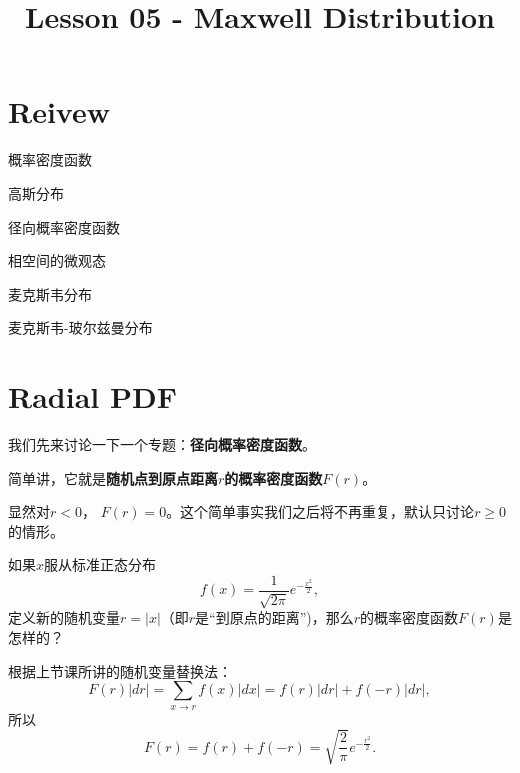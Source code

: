 \documentclass[CJK]{beamer}
\title{Lesson 05 - Maxwell Distribution}
\author{}
\date{}
\begin{document}

\section{Reivew}

\begin{frame}
\bch
{\large
\bitem
\item{概率密度函数}
\item{高斯分布}
\eitem}
\ech
\end{frame}

\begin{frame}
\bch
\bitem
\item{径向概率密度函数}
\item{相空间的微观态}
\item{麦克斯韦分布}
\item{麦克斯韦-玻尔兹曼分布}  
\eitem
\ech
\end{frame}

\section{Radial PDF}



\begin{frame}
\bch
{\large
  我们先来讨论一下一个专题：{\bf 径向概率密度函数}。

  \skiplines
  
  简单讲，它就是{\bf 随机点到原点距离$r$的概率密度函数$F(r)$}。

  \skiplines

  显然对$r < 0$， $F(r)=0$。这个简单事实我们之后将不再重复，默认只讨论$r\ge 0$的情形。 
}
\ech
\end{frame}


\begin{frame}
\bch
{}
{\large 
  如果$x$服从标准正态分布
  $$f(x) = \frac{1}{\sqrt{2\pi}}e^{-\frac{x^2}{2}},$$
  定义新的随机变量$r=|x|$（即$r$是“到原点的距离”)，那么$r$的概率密度函数$F(r)$是怎样的？}
\ech
\end{frame}


\begin{frame}
\bch
根据上节课所讲的随机变量替换法：
{\large
  $$F(r) |dr| = \sum_{x\rightarrow r} f(x) |dx| = f(r)|dr| + f(-r)|dr|,$$
  所以
  $$F(r) = f(r)+f(-r) = \sqrt{\frac{2}{\pi}}e^{-\frac{r^2}{2}}.$$
}
\ech
\end{frame}
\end{document}
